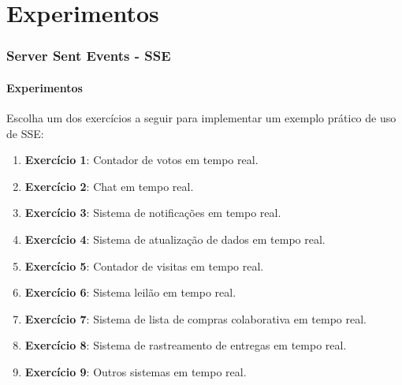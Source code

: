 \documentclass[
	9pt, %
	t, %
]{beamer}
\begin{document}
\section{Experimentos}

\begin{frame}
	\frametitle{Server Sent Events - SSE}
	\framesubtitle{Experimentos}

	Escolha um dos exercícios a seguir para implementar um exemplo prático de uso
	de SSE: \bigskip

	\begin{enumerate}
		\item \textbf{Exercício 1}: Contador de votos em tempo real.
		\item \textbf{Exercício 2}: Chat em tempo real.
		\item \textbf{Exercício 3}: Sistema de notificações em tempo real.
		\item \textbf{Exercício 4}: Sistema de atualização de dados em tempo real.
		\item \textbf{Exercício 5}: Contador de visitas em tempo real.
		\item \textbf{Exercício 6}: Sistema leilão em tempo real.
		\item \textbf{Exercício 7}: Sistema de lista de compras colaborativa em tempo real.
		\item \textbf{Exercício 8}: Sistema de rastreamento de entregas em tempo real.
		\item \textbf{Exercício 9}: Outros sistemas em tempo real.
	\end{enumerate}

\end{frame}
\end{document}
